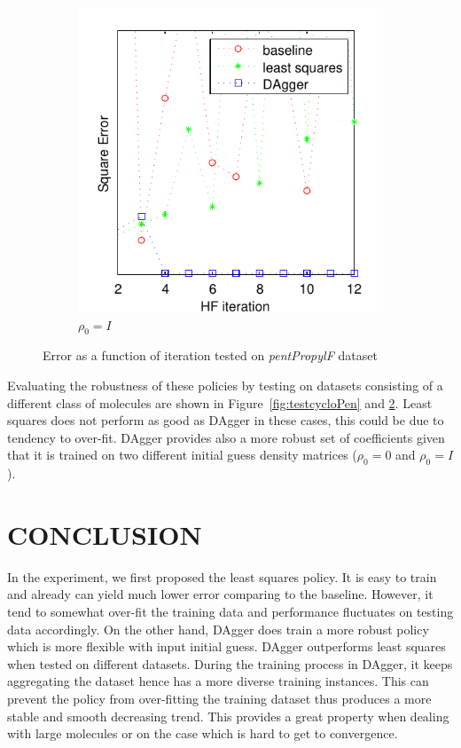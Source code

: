 \documentclass[twoside,11pt]{article}
\begin{document}
\begin{figure}[h!]
\begin{subfigure}{.5\textwidth}
  \includegraphics[scale=0.7]{propylsub_peye_test_12iter.pdf}
  \caption{$\rho_0 = I$}
  \label{fig:propSubI}
\end{subfigure}
\caption{Error as a function of iteration tested on \textit{pentPropylF} dataset}
\label{fig:testpropSub}
\end{figure}

Evaluating the robustness of these policies by testing on datasets consisting of a different class of molecules are shown in Figure~\ref{fig:testcycloPen} and \ref{fig:testpropSub}. Least squares does not perform as good as DAgger in these cases, this could be due to tendency to over-fit. DAgger provides also a more robust set of coefficients given that it is trained on two different initial guess density matrices ($\rho_0 = 0$ and $\rho_0 = I$).



\section{CONCLUSION}
In the experiment, we first proposed the least squares policy. It is easy to train and already can yield much lower error comparing to the baseline. However, it tend to somewhat over-fit the training data and performance fluctuates on testing data accordingly. On the other hand, DAgger does train a more robust policy which is more flexible with input initial guess. DAgger outperforms least squares when tested on different datasets.  
During the training process in DAgger, it keeps aggregating the dataset hence has a more diverse training instances. This can prevent the policy from over-fitting the training dataset thus produces a more stable and smooth decreasing trend. This provides a great property when dealing with large molecules or on the case which is hard to get to convergence.


\end{document}
